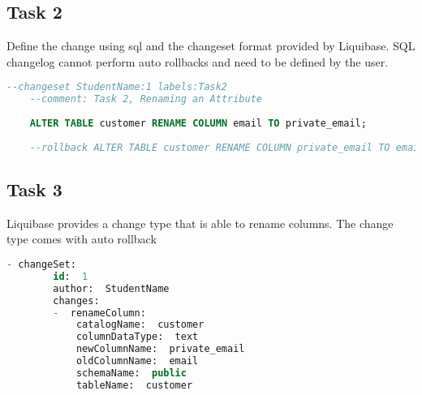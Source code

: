 \subsection*{Task 2}
%
Define the change using sql and the changeset format provided by Liquibase. SQL changelog cannot perform auto rollbacks and need to be defined by the user.

\begin{lstlisting}[language=SQL, caption={Sample Solution Task 2}]
	--changeset StudentName:1 labels:Task2 
	--comment: Task 2, Renaming an Attribute
	
	ALTER TABLE customer RENAME COLUMN email TO private_email;
	
	--rollback ALTER TABLE customer RENAME COLUMN private_email TO email;
\end{lstlisting}

\subsection*{Task 3}
%
Liquibase provides a change type that is able to rename columns. The change type comes with auto rollback 

\begin{lstlisting}[language=SQL, caption={Sample Solution Task 3}]
	- changeSet:  
		id:  1  
		author:  StudentName  
		changes:  
		-  renameColumn:  
			catalogName:  customer  
			columnDataType:  text  
			newColumnName:  private_email  
			oldColumnName:  email  
			schemaName:  public  
			tableName:  customer
\end{lstlisting}

